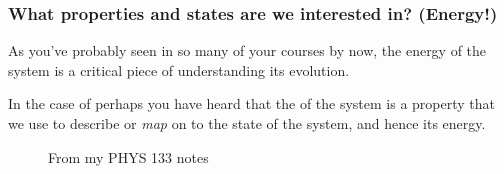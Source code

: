 \documentclass[hyperref={colorlinks=true}]{beamer}
\begin{document}
\begin{frame}%
  \frametitle{What properties and states are we interested in? (Energy!)}


  As you've probably seen in so many of your courses by now, the energy of the system is a critical piece of understanding its evolution.
  
  \vspace{0.3cm}
  
  In the case of  perhaps you have heard that the  of the system is a property that we use to describe or \textit{map} on to the state of the system, and hence its energy.

  \begin{figure}
    \centering
    \caption{From my PHYS 133 notes}
  \end{figure}

\end{frame}

\end{document}

